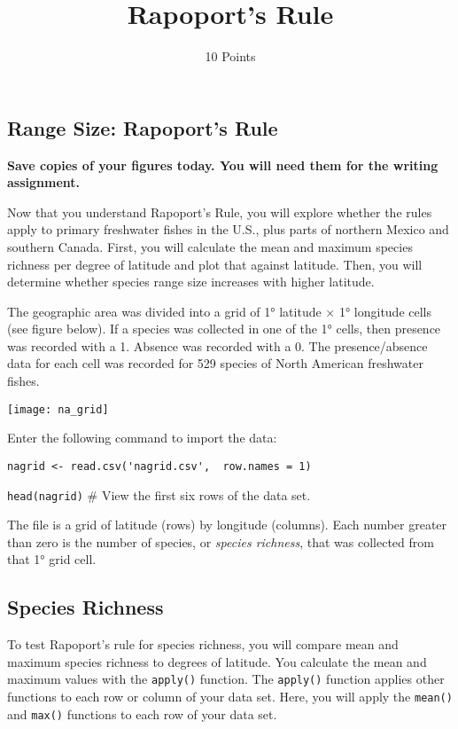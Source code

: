 \documentclass[11pt]{article}
\title{Rapoport's Rule}
\author{10 Points}
\date{}                                           %
\begin{document}
\thispagestyle{first_page}

\subsection*{Range Size: Rapoport's Rule} %

\textbf{Save copies of your figures today. You will need them for the
writing assignment.}

Now that you understand Rapoport's Rule, you will explore whether the 
rules apply to primary freshwater fishes in the U.S., plus parts of 
northern Mexico and southern Canada. First, you will calculate the 
mean and maximum species richness per degree of latitude and plot that 
against latitude. Then, you will determine whether species range size 
increases with higher latitude.

The geographic area was divided into a grid of 1° latitude $\times$ 1°
longitude cells (see figure below). If a species was collected in one 
of the 1° cells, then presence was recorded with a 1. Absence was 
recorded with a 0. The presence/absence data for each cell was 
recorded for 529 species of North American freshwater fishes.

\begin{center}
	\texttt{[image: na\_grid]}
\end{center}

Enter the following command to import the data:

\begin{verbatim}
nagrid <- read.csv('nagrid.csv',  row.names = 1)
\end{verbatim}

\texttt{head(nagrid)} \qquad \# View the first six rows of the data set.

The file is a grid of latitude (rows) by longitude (columns). Each
number greater than zero is the number of species, or \emph{species
richness}, that was collected from that 1° grid cell.

\subsection*{Species Richness}

To test Rapoport's rule for species richness, you will compare mean and
maximum species richness to degrees of latitude. You calculate the
mean and maximum values with the \texttt{apply()} function. The \texttt{apply()}
function applies other functions to each row or column 
of your data set. Here, you will apply the \texttt{mean()} and
\texttt{max()} functions to each row of your data set.
\end{document}
